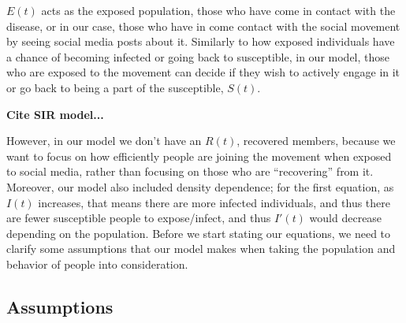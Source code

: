 \documentclass{article}
\begin{document}
    
    $E(t)$ acts as the exposed population, those who have come in contact with the disease, or in our case, those who have in come contact with the social movement by seeing social media posts about it. Similarly to how exposed individuals have a chance of becoming infected or going back to susceptible, in our model, those who are exposed to the movement can decide if they wish to actively engage in it or go back to being a part of the susceptible, $S(t)$.
    
    \textbf{Cite SIR model...} 
    
    
    
    
    However, in our model we don’t have an $R(t)$, recovered members, because we want to focus on how efficiently people are joining the movement when exposed to social media, rather than focusing on those who are “recovering” from it. Moreover, our model also included density dependence; for the first equation, as $I(t)$ increases, that means there are more infected individuals, and thus there are fewer susceptible people to expose/infect, and thus $I'(t)$ would decrease depending on the population.
    Before we start stating our equations, we need to clarify some assumptions that our model makes when taking the population and behavior of people into consideration.

    \subsection{Assumptions}
    
\end{document}
